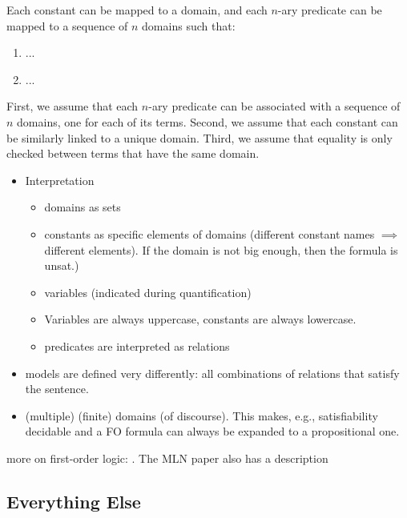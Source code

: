 \begin{assumption}
  Each constant can be mapped to a domain, and each $n$-ary predicate can be mapped to a sequence of $n$ domains such that:
  \begin{enumerate}
  \item ...
  \item ...
  \end{enumerate}
\end{assumption}

First, we assume that each $n$-ary predicate can be associated with a sequence of $n$ domains, one for each of its terms. Second, we assume that each constant can be similarly linked to a unique domain. Third, we assume that equality is only checked between terms that have the same domain.


\begin{itemize}
\item Interpretation
  \begin{itemize}
  \item domains as sets
  \item constants as specific elements of domains (different constant names $\implies$ different elements). If the domain is not big enough, then the formula is unsat.)
  \item variables (indicated during quantification)
  \item Variables are always uppercase, constants are always lowercase.
  \item predicates are interpreted as relations
  \end{itemize}
\item models are defined very differently: all combinations of relations that satisfy the sentence.
\item (multiple) (finite) domains (of discourse). This makes, e.g., satisfiability decidable and a FO formula can always be expanded to a propositional one.
\end{itemize}

more on first-order logic: \citep{DBLP:books/daglib/0023546}. The MLN paper also has a description

\subsection{Everything Else}

